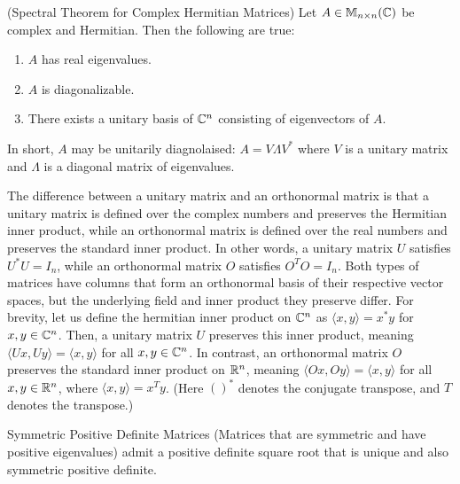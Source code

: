 \documentclass[main.tex]{subfiles}
\begin{document}
\begin{theorem}
    (Spectral Theorem for Complex Hermitian Matrices) Let $A \in \mathbb M_{n\times n}(\mathbb C)$ be complex and Hermitian. Then the following are true:
    \begin{enumerate}
        \item $A$ has real eigenvalues.
        \item $A$ is diagonalizable.
        \item There exists a unitary basis of $\mathbb C^n$ consisting of eigenvectors of $A$.
    \end{enumerate}
In short, $A$ may be unitarily diagnolaised: $A=V\Lambda V^*$ where $V$ is a unitary matrix and $\Lambda$ is a diagonal matrix of eigenvalues.
\end{theorem}
\begin{remark}
    The difference between a unitary matrix and an orthonormal matrix is that a unitary matrix is defined over the complex numbers and preserves the Hermitian inner product, while an orthonormal matrix is defined over the real numbers and preserves the standard inner product. In other words, a unitary matrix $U$ satisfies $U^*U = I_n$, while an orthonormal matrix $O$ satisfies $O^TO = I_n$. Both types of matrices have columns that form an orthonormal basis of their respective vector spaces, but the underlying field and inner product they preserve differ. For brevity, let us define the hermitian inner product on $\mathbb C^n$ as $\langle x, y \rangle = x^*y$ for $x,y \in \mathbb C^n$. Then, a unitary matrix $U$ preserves this inner product, meaning $\langle Ux, Uy \rangle = \langle x, y \rangle$ for all $x,y \in \mathbb C^n$. In contrast, an orthonormal matrix $O$ preserves the standard inner product on $\mathbb R^n$, meaning $\langle Ox, Oy \rangle = \langle x, y \rangle$ for all $x,y \in \mathbb R^n$, where $\langle x, y \rangle = x^Ty$. (Here $()^*$ denotes the conjugate transpose, and $T$ denotes the transpose.)
\end{remark}
\begin{lemma}\label{proof of big theorem}Symmetric Positive Definite Matrices (Matrices that are symmetric and have positive eigenvalues) admit a positive definite square root that is unique and also symmetric positive definite.

\end{lemma}
\end{document}
